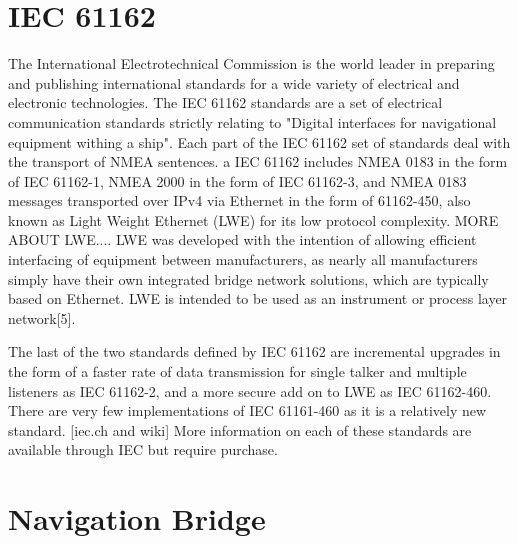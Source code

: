 \documentclass{article}
\begin{document}
\section{IEC 61162}
The International Electrotechnical Commission is the world leader in preparing and publishing international standards for a wide variety of electrical and electronic technologies. The IEC 61162 standards are a set of electrical communication standards strictly relating to "Digital interfaces for navigational equipment withing a ship". Each part of the IEC 61162 set of standards deal with the transport of NMEA sentences. a IEC 61162 includes NMEA 0183 in the form of IEC 61162-1, NMEA 2000 in the form of IEC 61162-3, and NMEA 0183 messages transported over IPv4 via Ethernet in the form of 61162-450, also known as Light Weight Ethernet (LWE) for its low protocol complexity. MORE ABOUT LWE.... LWE was developed with the intention of allowing efficient interfacing of equipment between manufacturers, as nearly all manufacturers simply have their own integrated bridge network solutions, which are typically based on Ethernet. LWE is intended to be used as an instrument or process layer network[5].

The last of the two standards defined by IEC 61162 are incremental upgrades in the form of a faster rate of data transmission for single talker and multiple listeners as IEC 61162-2, and a more secure add on to LWE as IEC 61162-460. There are very few implementations of IEC 61161-460 as it is a relatively new standard. [iec.ch and wiki] More information on each of these standards are available through IEC but require purchase.

\section{Navigation Bridge}
 
\end{document}
